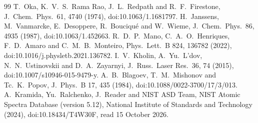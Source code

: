 \documentclass[11pt]{article}
\begin{document}
\begin{thebibliography}{99}
 T.~Oka, K.~V.~S.~Rama Rao, J.~L.~Redpath and R.~F.~Firestone, J.\ Chem.\ Phys.\ 61, 4740 (1974), doi:10.1063/1.1681797.
 H.~Janssens, M.~Vanmarcke, E.~Desoppere, R.~Bouciqu\'e and W.~Wieme, J.\ Chem.\ Phys.\ 86, 4935 (1987), doi:10.1063/1.452663.
 R.~D.~P.~Mano, C.~A.~O.~Henriques, F.~D.~Amaro and C.~M.~B.~Monteiro, Phys.\ Lett.\ B 824, 136782 (2022), doi:10.1016/j.physletb.2021.136782.
 I.~V.~Kholin, A.~Yu.~L'dov, N.~N.~Ustinovskii and D.~A.~Zayarnyi, J.\ Russ.\ Laser Res.\ 36, 74 (2015), doi:10.1007/s10946-015-9479-y.
 A.~B.~Blagoev, T.~M.~Mishonov and Tc.~K.~Popov, J.\ Phys.\ B 17, 435 (1984), doi:10.1088/0022-3700/17/3/013.
 A.~Kramida, Yu.~Ralchenko, J.~Reader and NIST ASD Team, NIST Atomic Spectra Database (version 5.12), National Institute of Standards and Technology (2024), doi:10.18434/T4W30F, read 15 October 2026.
\end{thebibliography}
\end{document}
